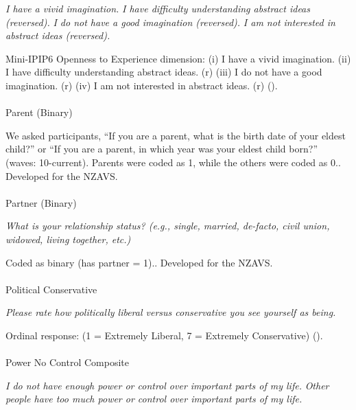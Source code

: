 \documentclass[
  single column]{article}
\makeatletter
\let\oldparagraph\paragraph
\renewcommand{\paragraph}{
    \@ifstar
      \xxxParagraphStar
      \xxxParagraphNoStar
  }
\newcommand{\xxxParagraphStar}[1]{\oldparagraph*{#1}\mbox{}}
\newcommand{\xxxParagraphNoStar}[1]{\oldparagraph{#1}\mbox{}}
\makeatother
\begin{document}
\emph{I have a vivid imagination.} \emph{I have difficulty understanding
abstract ideas (reversed).} \emph{I do not have a good imagination
(reversed).} \emph{I am not interested in abstract ideas (reversed).}

Mini-IPIP6 Openness to Experience dimension: (i) I have a vivid
imagination. (ii) I have difficulty understanding abstract ideas. (r)
(iii) I do not have a good imagination. (r) (iv) I am not interested in
abstract ideas. (r) ().

\paragraph{Parent (Binary)}\label{parent-binary}

We asked participants, ``If you are a parent, what is the birth date of
your eldest child?'' or ``If you are a parent, in which year was your
eldest child born?'' (waves: 10-current). Parents were coded as 1, while
the others were coded as 0.. Developed for the NZAVS.

\paragraph{Partner (Binary)}\label{partner-binary}

\emph{What is your relationship status? (e.g., single, married,
de-facto, civil union, widowed, living together, etc.)}

Coded as binary (has partner = 1).. Developed for the NZAVS.

\paragraph{Political Conservative}\label{political-conservative-1}

\emph{Please rate how politically liberal versus conservative you see
yourself as being.}

Ordinal response: (1 = Extremely Liberal, 7 = Extremely Conservative)
().

\paragraph{Power No Control Composite}\label{power-no-control-composite}

\emph{I do not have enough power or control over important parts of my
life.} \emph{Other people have too much power or control over important
parts of my life.}
\end{document}
